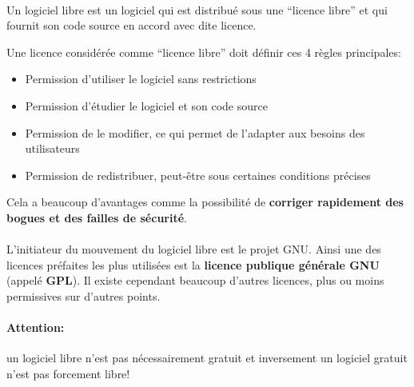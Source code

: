 \paragraph{} Un logiciel libre est un logiciel qui est distribué sous une
``licence libre'' et qui fournit son code source en accord avec dite licence.

Une licence considérée comme ``licence libre'' doit définir ces 4
règles principales:
\begin{itemize}
	\item Permission d'utiliser le logiciel sans restrictions
	\item Permission d'étudier le logiciel et son code source
	\item Permission de le modifier, ce qui permet de l'adapter aux besoins des
		utilisateurs
	\item Permission de redistribuer, peut-être sous certaines conditions
		précises
\end{itemize}
Cela a beaucoup d'avantages comme la possibilité de \textbf{corriger rapidement
des bogues et des failles de sécurité}.

\paragraph{} L'initiateur du mouvement du logiciel libre est le projet GNU.
Ainsi une des licences préfaites les plus utilisées est la \textbf{licence
publique générale GNU} (appelé \textbf{GPL}). Il existe cependant beaucoup
d'autres licences, plus ou moins permissives sur d'autres points.

\paragraph{Attention:} un logiciel libre n'est pas nécessairement gratuit et
inversement un logiciel gratuit n'est pas forcement libre!
